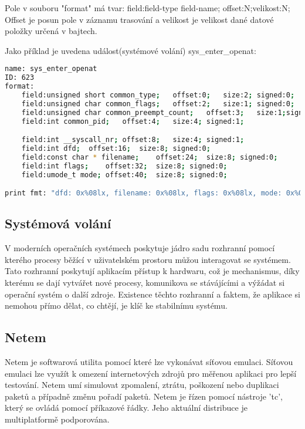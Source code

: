 Pole v souboru "format" má tvar:
field:field-type field-name; offset:N;velikost:N;
Offset je posun pole v záznamu trasování a velikost je velikost dané datové položky určená v bajtech.

Jako příklad je uvedena událost(systémové volání) sys_enter_openat:
\begin{lstlisting}[language=bash]
name: sys_enter_openat
ID: 623
format:
	field:unsigned short common_type;	offset:0;	size:2;	signed:0;
	field:unsigned char common_flags;	offset:2;	size:1;	signed:0;
	field:unsigned char common_preempt_count;	offset:3;	size:1;signed:0;
	field:int common_pid;	offset:4;	size:4;	signed:1;

	field:int __syscall_nr;	offset:8;	size:4;	signed:1;
	field:int dfd;	offset:16;	size:8;	signed:0;
	field:const char * filename;	offset:24;	size:8;	signed:0;
	field:int flags;	offset:32;	size:8;	signed:0;
	field:umode_t mode;	offset:40;	size:8;	signed:0;

print fmt: "dfd: 0x%08lx, filename: 0x%08lx, flags: 0x%08lx, mode: 0x%08lx", ((unsigned long)(REC->dfd)), ((unsigned long)(REC->filename)), ((unsigned long)(REC->flags)), ((unsigned long)(REC->mode))
\end{lstlisting}

\iffalse
https://www.kernel.org/doc/Documentation/trace/events.rst
\fi

\subsection{Systémová volání}

V moderních operačních systémech poskytuje jádro sadu rozhranní pomocí kterého procesy běžící v uživatelském prostoru můžou interagovat
se systémem. Tato rozhranní poskytují aplikacím přístup k hardwaru, což je mechanismus, díky kterému se dají vytvářet nové procesy,
komunikova se stávájícími a výžádat si operační systém o další zdroje. Existence těchto rozhranní a faktem, že aplikace si nemohou přímo
dělat, co chtějí, je klíč ke stabilnímu systému.

\iffalse
BOOK Linux Kernel Development 3rd edition page 69
\fi

\subsection{Netem}\cite{netem}
Netem je softwarová utilita pomocí které lze vykonávat síťovou emulaci. Síťovou emulaci lze využít k omezení internetových zdrojů pro měřenou aplikaci pro lepší testování.
Netem umí simulovat zpomalení, ztrátu, poškození nebo duplikaci paketů a případně změnu pořadí paketů. Netem je řízen pomocí nástroje 'tc', který se ovládá pomocí příkazové řádky.
Jeho aktuální distribuce je multiplatformě podporována.


